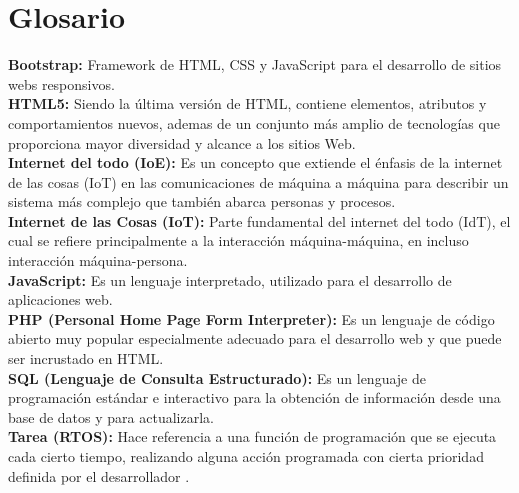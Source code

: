 \chapter*{Glosario}%

\textbf{Bootstrap:} Framework de HTML, CSS y JavaScript para el desarrollo de sitios webs responsivos. \cite{BS}\\

\textbf{HTML5:} Siendo la última versión de HTML, contiene elementos, atributos y comportamientos nuevos, ademas de un conjunto más amplio de tecnologías que proporciona mayor diversidad y alcance a los sitios Web.\cite{HTML5}\\

\textbf{Internet del todo (IoE):} Es un concepto que extiende el énfasis de la internet de las cosas (IoT) en las comunicaciones de máquina a máquina para describir un sistema más complejo que también abarca personas y procesos.\cite{IOE} \\

\textbf{Internet de las Cosas (IoT):} Parte fundamental del internet del todo (IdT), el cual se refiere principalmente a la interacción máquina-máquina, en incluso interacción máquina-persona.\cite{TechT2017}\\

\textbf{JavaScript:} Es un lenguaje interpretado, utilizado para el desarrollo de aplicaciones web.\cite{JS}\\

\textbf{PHP (Personal Home Page Form Interpreter):} Es un lenguaje de código abierto muy popular especialmente adecuado para el desarrollo web y que puede ser incrustado en HTML.\cite{PHP}\\

\textbf{SQL (Lenguaje de Consulta Estructurado):} Es un lenguaje de programación estándar e interactivo para la obtención de información desde una base de datos y para actualizarla.\cite{DB}\\

\textbf{Tarea (RTOS):} Hace referencia a una función de programación que se ejecuta cada cierto tiempo, realizando alguna acción programada con cierta prioridad definida por el desarrollador \cite{FRTOS}.\\